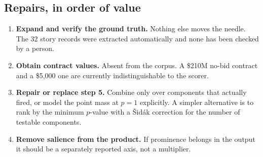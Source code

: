\documentclass[11pt,a4paper]{article}
\begin{document}
\subsection*{Repairs, in order of value}

\begin{enumerate}[leftmargin=1.4em,itemsep=0.25em]
\item \textbf{Expand and verify the ground truth.} Nothing else moves the needle. The 32
      story records were extracted automatically and none has been checked by a person.
\item \textbf{Obtain contract values.} Absent from the corpus. A \$210M no-bid contract
      and a \$5{,}000 one are currently indistinguishable to the scorer.
\item \textbf{Repair or replace step 5.} Combine only over components that actually
      fired, or model the point mass at $p=1$ explicitly. A simpler alternative is to rank
      by the minimum $p$-value with a \v{S}id\'ak correction for the number of testable
      components.
\item \textbf{Remove salience from the product.} If prominence belongs in the output it
      should be a separately reported axis, not a multiplier.
\end{enumerate}
\end{document}

